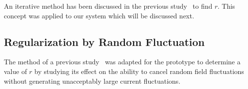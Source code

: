 An iterative method has been discussed in the previous study~\cite{bea} to find $r$. This concept was applied to our system which will be discussed next.











\subsection{Regularization by Random Fluctuation}\label{sec:mont}

The method of a previous study~\cite{bea} was adapted for the prototype to determine a value of $r$ by studying its effect on the ability to cancel random field fluctuations without generating unacceptably large current fluctuations.

